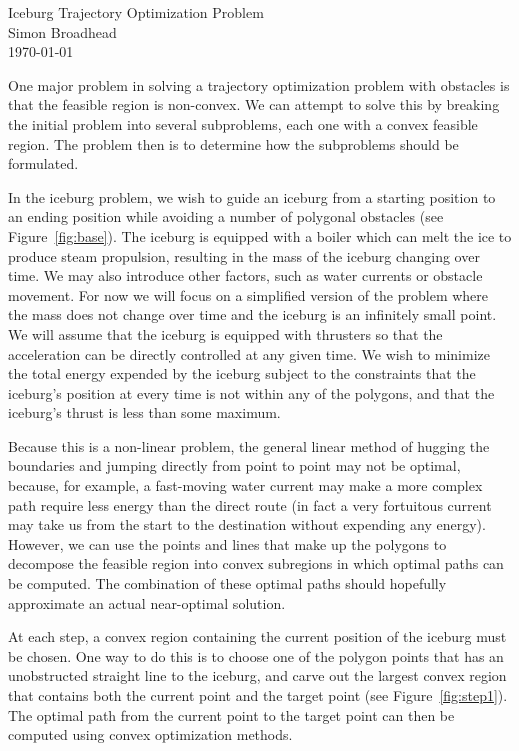 \documentclass[12pt]{article}
\begin{document}
{\centering\noindent\large Iceburg Trajectory Optimization Problem\\
\normalsize Simon Broadhead\\
\today\\}

\vspace{2em}

One major problem in solving a trajectory optimization problem with obstacles is that the feasible region is
non-convex. We can attempt to solve this by breaking the initial problem into several subproblems, each one with a
convex feasible region. The problem then is to determine how the subproblems should be formulated.

In the iceburg problem, we wish to guide an iceburg from a starting position to an ending position while avoiding a
number of polygonal obstacles (see Figure~\ref{fig:base}).
The iceburg is equipped with a boiler which can melt the ice to produce steam propulsion,
resulting in the mass of the iceburg changing over time. We may also introduce other factors, such as water currents or
obstacle movement. For now we will focus on a simplified version of the problem where the mass does not change over time
and the iceburg is an infinitely small point. We will assume that the iceburg is equipped with thrusters so that the 
acceleration can be directly controlled at any given time.
We wish to minimize the total energy expended by the iceburg subject to the constraints that the iceburg's position
at every time is not within any of the polygons, and that the iceburg's thrust is less than some maximum.

Because this is a non-linear problem, the general linear method of hugging the boundaries and jumping directly
from point to point may not be optimal, because, for example, a fast-moving water current may make a more complex path
require less energy than the direct route (in fact a very fortuitous current may take us from the start to the destination
without expending any energy).
However, we can use the points and lines that make up the polygons to decompose the
feasible region into convex subregions in which optimal paths can be computed. The combination of these optimal paths
should hopefully approximate an actual near-optimal solution.

At each step, a convex region containing the current position of the iceburg must be chosen. One way to do this is
to choose one of the polygon points that has an unobstructed straight line to the iceburg, and carve out the largest
convex region that contains both the current point and the target point (see Figure~\ref{fig:step1}).
The optimal path from the current point to the target point can then be computed using convex optimization methods.
\end{document}
